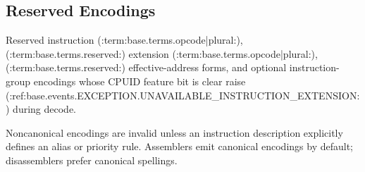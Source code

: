 \subsection{Reserved Encodings}
Reserved instruction (:term:base.terms.opcode|plural:), (:term:base.terms.reserved:) extension (:term:base.terms.opcode|plural:), (:term:base.terms.reserved:) effective-address forms, and optional
instruction-group encodings whose CPUID feature bit is clear raise (:ref:base.events.EXCEPTION.UNAVAILABLE_INSTRUCTION_EXTENSION:) during decode.

Noncanonical encodings are invalid unless an instruction description explicitly defines an alias or priority rule.
Assemblers emit canonical encodings by default; disassemblers prefer canonical spellings.

\Needspace{3.6in}
